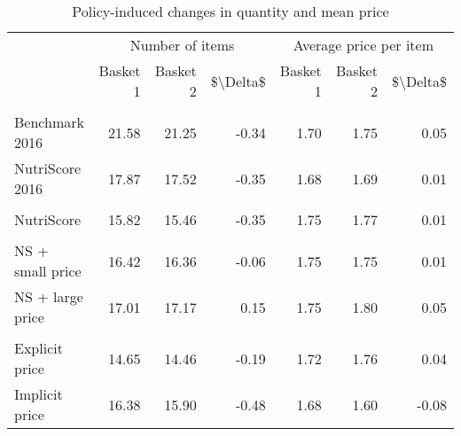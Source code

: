 \begin{table}[!h]

\caption{\label{tab:change_n_prod_NS}Policy-induced changes in quantity and mean price}
\centering
\begin{tabular}[t]{lrrrrrr}
\toprule
\multicolumn{1}{c}{ } & \multicolumn{3}{c}{Number of items} & \multicolumn{3}{c}{Average price per item} \\
\cmidrule(l{3pt}r{3pt}){2-4} \cmidrule(l{3pt}r{3pt}){5-7}
 & Basket 1 & Basket 2 & \$\textbackslash{}Delta\$ & Basket 1 & Basket 2 & \$\textbackslash{}Delta\$\\
\midrule
\addlinespace[0.3em]
\multicolumn{7}{l}{\textbf{Benchmarks}}\\
\hspace{1em}Benchmark 2016 & 21.58 & 21.25 & -0.34 & 1.70 & 1.75 & 0.05\\
\hspace{1em}NutriScore 2016 & 17.87 & 17.52 & -0.35 & 1.68 & 1.69 & 0.01\\
\addlinespace[0.3em]
\multicolumn{7}{l}{\textbf{Labeling}}\\
\hspace{1em}NutriScore & 15.82 & 15.46 & -0.35 & 1.75 & 1.77 & 0.01\\
\addlinespace[0.3em]
\multicolumn{7}{l}{\textbf{Policy mix}}\\
\hspace{1em}NS + small price & 16.42 & 16.36 & -0.06 & 1.75 & 1.75 & 0.01\\
\hspace{1em}NS + large price & 17.01 & 17.17 & 0.15 & 1.75 & 1.80 & 0.05\\
\addlinespace[0.3em]
\multicolumn{7}{l}{\textbf{Price policy}}\\
\hspace{1em}Explicit price & 14.65 & 14.46 & -0.19 & 1.72 & 1.76 & 0.04\\
\hspace{1em}Implicit price & 16.38 & 15.90 & -0.48 & 1.68 & 1.60 & -0.08\\
\bottomrule
\end{tabular}
\end{table}

